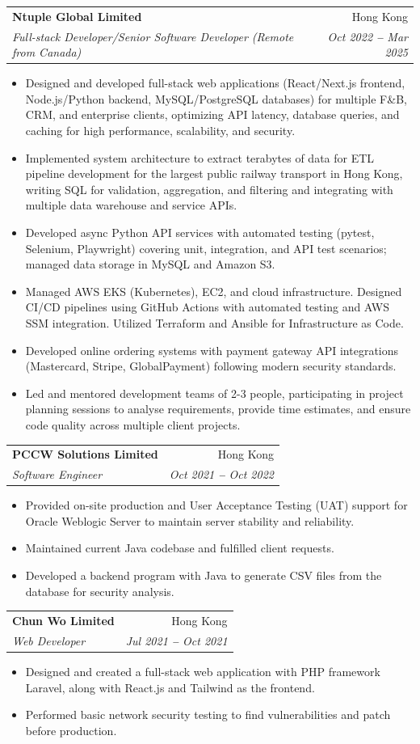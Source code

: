 \documentclass[letterpaper,11pt]{article}
\makeatletter
\newcommand{\resumeItem}[1]{
  \item\small{
    {#1 \vspace{-2pt}}
  }
}
\newcommand{\resumeSubheading}[4]{
  \vspace{-2pt}\item
    \begin{tabular*}{0.97\textwidth}[t]{l@{\extracolsep{\fill}}r}
      \textbf{#1} & #2 \\
      \textit{\small#3} & \textit{\small #4} \\
    \end{tabular*}\vspace{-7pt}
}
\newcommand{\resumeItemListStart}{\begin{itemize}}
\newcommand{\resumeItemListEnd}{\end{itemize}\vspace{-5pt}}
\makeatother
\begin{document}
    \resumeSubheading
      {Ntuple Global Limited}{Hong Kong}
      {Full-stack Developer/Senior Software Developer (Remote from Canada)}{Oct 2022 \textbf{--} Mar 2025}
        \resumeItemListStart
            \resumeItem{Designed and developed full-stack web applications (React/Next.js frontend, Node.js/Python backend, MySQL/PostgreSQL databases) for multiple F\&B, CRM, and enterprise clients, optimizing API latency, database queries, and caching for high performance, scalability, and security.}
            \resumeItem{Implemented system architecture to extract terabytes of data for ETL pipeline development for the largest public railway transport in Hong Kong, writing SQL for validation, aggregation, and filtering and integrating with multiple data warehouse and service APIs.}
            \resumeItem{Developed async Python API services with automated testing (pytest, Selenium, Playwright) covering unit, integration, and API test scenarios; managed data storage in MySQL and Amazon S3.}
            \resumeItem{Managed AWS EKS (Kubernetes), EC2, and cloud infrastructure. Designed CI/CD pipelines using GitHub Actions with automated testing and AWS SSM integration. Utilized Terraform and Ansible for Infrastructure as Code.}
            \resumeItem{Developed online ordering systems with payment gateway API integrations (Mastercard, Stripe, GlobalPayment) following modern security standards.}
            \resumeItem{Led and mentored development teams of 2-3 people, participating in project planning sessions to analyse requirements, provide time estimates, and ensure code quality across multiple client projects.}
        \resumeItemListEnd

    \resumeSubheading
      {PCCW Solutions Limited}{Hong Kong}
      {Software Engineer}{Oct 2021 \textbf{--} Oct 2022}
        \resumeItemListStart
            \resumeItem{Provided on-site production and User Acceptance Testing (UAT) support for Oracle Weblogic Server to maintain server stability and reliability.}
            \resumeItem{Maintained current Java codebase and fulfilled client requests.}
            \resumeItem{Developed a backend program with Java to generate CSV files from the database for security analysis.}
        \resumeItemListEnd

    \resumeSubheading
      {Chun Wo Limited}{Hong Kong}
      {Web Developer}{Jul 2021 \textbf{--} Oct 2021}
        \resumeItemListStart
            \resumeItem{Designed and created a full-stack web application with PHP framework Laravel, along with React.js and Tailwind as the frontend.}
            \resumeItem{Performed basic network security testing to find vulnerabilities and patch before production.}
        \resumeItemListEnd
    
\end{document}
